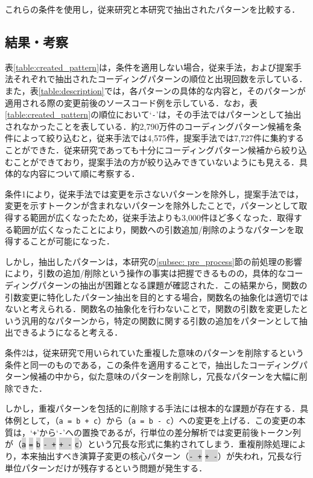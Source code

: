 \documentclass[submit,techrep,noauthor]{ipsj}
\begin{document}
これらの条件を使用し，従来研究と本研究で抽出されたパターンを比較する．

\subsection{結果・考察}
表\ref{table:created_pattern}は，条件を適用しない場合，従来手法，および提案手法それぞれで抽出されたコーディングパターンの順位と出現回数を示している．また，表\ref{table:description}では，各パターンの具体的な内容と，そのパターンが適用される際の変更前後のソースコード例を示している．なお，表\ref{table:created_pattern}の順位において`\texttt{-}'は，その手法ではパターンとして抽出されなかったことを表している．約2,790万件のコーディングパターン候補を条件によって絞り込むと，従来手法では4,575件，提案手法では7,727件に集約することができた．従来研究であっても十分にコーディングパターン候補から絞り込むことができており，提案手法の方が絞り込みできていないようにも見える．具体的な内容について順に考察する．

条件1により，従来手法では変更を示さないパターンを除外し，提案手法では，変更を示すトークンが含まれないパターンを除外したことで，パターンとして取得する範囲が広くなったため，従来手法よりも3,000件ほど多くなった．取得する範囲が広くなったことにより，関数への引数追加/削除のようなパターンを取得することが可能になった．

しかし，抽出したパターンは，本研究の\ref{subsec: pre_process}節の前処理の影響により，引数の追加/削除という操作の事実は把握できるものの，具体的なコーディングパターンの抽出が困難となる課題が確認された．この結果から，関数の引数変更に特化したパターン抽出を目的とする場合，関数名の抽象化は適切ではないと考えられる．関数名の抽象化を行わないことで，関数の引数を変更したという汎用的なパターンから，特定の関数に関する引数の追加をパターンとして抽出できるようになると考える．

条件2は，従来研究で用いられていた重複した意味のパターンを削除するという条件と同一のものである，この条件を適用することで，抽出したコーディングパターン候補の中から，似た意味のパターンを削除し，冗長なパターンを大幅に削除できた．

しかし，重複パターンを包括的に削除する手法には根本的な課題が存在する．具体例として，（\texttt{a = b + c}）から（\texttt{a = b - c}）への変更を上げる．この変更の本質は，`\texttt{+}'から`\texttt{-}'への置換であるが，行単位の差分解析では変更前後トークン列が（\colorbox{lightgray}{\texttt{a}} \colorbox{lightgray}{\texttt{=}} \colorbox{lightgray}{\texttt{b}} \colorbox{lightgray}{\texttt{- +}} \colorbox{lightgray}{\texttt{+ -}} \colorbox{lightgray}{\texttt{c}}）という冗長な形式に集約されてしまう．重複削除処理により，本来抽出すべき演算子変更の核心パターン（\colorbox{lightgray}{\texttt{- +}} \colorbox{lightgray}{\texttt{+ -}}）が失われ，冗長な行単位パターンだけが残存するという問題が発生する．
\end{document}
